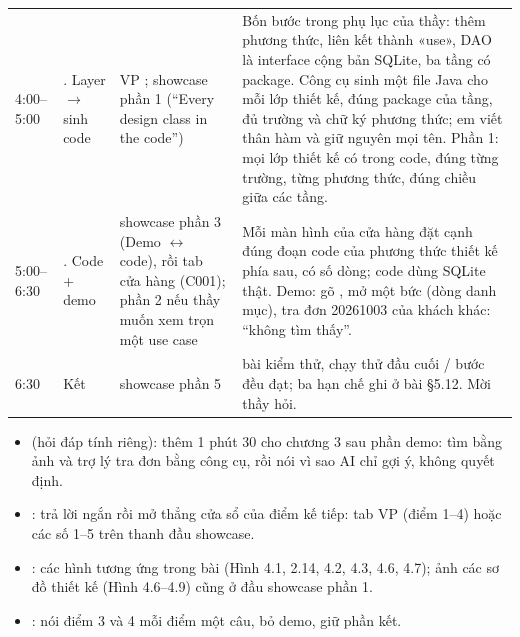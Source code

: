 \begin{center}
\begin{tabular}{@{}P{1.8cm}P{2.5cm}P{4.8cm}P{6.7cm}@{}}
4:00--5:00 & . Layer $\to$ sinh code & VP ; showcase phần 1 (``Every design class in the code'') & Bốn bước trong phụ lục của thầy: thêm phương thức, liên kết thành «use», DAO là interface cộng bản SQLite, ba tầng có package. Công cụ sinh một file Java cho mỗi lớp thiết kế, đúng package của tầng, đủ trường và chữ ký phương thức; em viết thân hàm và giữ nguyên mọi tên. Phần 1: mọi lớp thiết kế có trong code, đúng từng trường, từng phương thức, đúng chiều giữa các tầng.\\
5:00--6:30 & . Code + demo & showcase phần 3 (Demo $\leftrightarrow$ code), rồi tab cửa hàng (C001); phần 2 nếu thầy muốn xem trọn một use case & Mỗi màn hình của cửa hàng đặt cạnh đúng đoạn code của phương thức thiết kế phía sau, có số dòng; code dùng SQLite thật. Demo: gõ , mở một bức (dòng danh mục), tra đơn 20261003 của khách khác: ``không tìm thấy''.\\
6:30 & Kết & showcase phần 5 & \factTests{} bài kiểm thử, chạy thử đầu cuối \factEtoE{}/\factEtoE{} bước đều đạt; ba hạn chế ghi ở bài §5.12. Mời thầy hỏi.\\
\bottomrule
\end{tabular}
\end{center}
\begin{itemize}
\item {} (hỏi đáp tính riêng): thêm 1 phút 30 cho chương 3 sau phần demo: tìm bằng ảnh và trợ lý tra đơn bằng công cụ, rồi nói vì sao AI chỉ gợi ý, không quyết định.
\item {}: trả lời ngắn rồi mở thẳng cửa sổ của điểm kế tiếp: tab VP (điểm 1--4) hoặc các số 1--5 trên thanh đầu showcase.
\item {}: các hình tương ứng trong bài (Hình 4.1, 2.14, 4.2, 4.3, 4.6, 4.7); ảnh các sơ đồ thiết kế (Hình 4.6--4.9) cũng ở đầu showcase phần 1.
\item {}: nói điểm 3 và 4 mỗi điểm một câu, bỏ demo, giữ phần kết.
\end{itemize}
